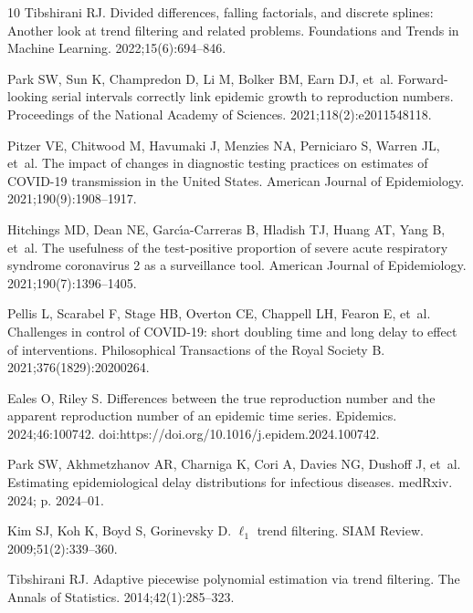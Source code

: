 \documentclass[10pt,letterpaper]{article}
\begin{document}
\begin{thebibliography}{10}
  Tibshirani RJ.
  \newblock Divided differences, falling factorials, and discrete splines:
    Another look at trend filtering and related problems.
  \newblock Foundations and Trends in Machine Learning.
    2022;15(6):694--846.
  
  Park SW, Sun K, Champredon D, Li M, Bolker BM, Earn DJ, et~al.
  \newblock Forward-looking serial intervals correctly link epidemic growth to
    reproduction numbers.
  \newblock Proceedings of the National Academy of Sciences.
    2021;118(2):e2011548118.
  
  Pitzer VE, Chitwood M, Havumaki J, Menzies NA, Perniciaro S, Warren JL, et~al.
  \newblock The impact of changes in diagnostic testing practices on estimates of
    {COVID-19} transmission in the {U}nited {S}tates.
  \newblock American Journal of Epidemiology. 2021;190(9):1908--1917.
  
  Hitchings MD, Dean NE, Garc{\'\i}a-Carreras B, Hladish TJ, Huang AT, Yang B,
    et~al.
  \newblock The usefulness of the test-positive proportion of severe acute
    respiratory syndrome coronavirus 2 as a surveillance tool.
  \newblock American Journal of Epidemiology. 2021;190(7):1396--1405.
  
  Pellis L, Scarabel F, Stage HB, Overton CE, Chappell LH, Fearon E, et~al.
  \newblock Challenges in control of {COVID-19}: short doubling time and long
    delay to effect of interventions.
  \newblock Philosophical Transactions of the Royal Society B.
    2021;376(1829):20200264.
  
  Eales O, Riley S.
  \newblock Differences between the true reproduction number and the apparent
    reproduction number of an epidemic time series.
  \newblock Epidemics. 2024;46:100742.
  \newblock doi:{https://doi.org/10.1016/j.epidem.2024.100742}.
  
  Park SW, Akhmetzhanov AR, Charniga K, Cori A, Davies NG, Dushoff J, et~al.
  \newblock Estimating epidemiological delay distributions for infectious
    diseases.
  \newblock medRxiv. 2024; p. 2024--01.
  
  Kim SJ, Koh K, Boyd S, Gorinevsky D.
  \newblock $\ell_1$ trend filtering.
  \newblock SIAM Review. 2009;51(2):339--360.
  
  Tibshirani RJ.
  \newblock Adaptive piecewise polynomial estimation via trend filtering.
  \newblock The Annals of Statistics. 2014;42(1):285--323.
  

\end{thebibliography}
\end{document}
